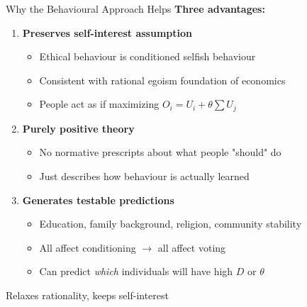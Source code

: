 \documentclass[10pt]{beamer}
\begin{document}
\begin{frame}{Why the Behavioural Approach Helps}
\textbf{Three advantages:}


\begin{enumerate}
\item \textbf{Preserves self-interest assumption}
\begin{itemize}
\item Ethical behaviour is conditioned selfish behaviour
\item Consistent with rational egoism foundation of economics
\item People act as if maximizing $O_i = U_i + \theta \sum U_j$
\end{itemize}

\item \textbf{Purely positive theory}
\begin{itemize}
\item No normative prescripts about what people "should" do
\item Just describes how behaviour is actually learned
\end{itemize}

\item \textbf{Generates testable predictions}
\begin{itemize}
\item Education, family background, religion, community stability
\item All affect conditioning $\rightarrow$ all affect voting
\item Can predict \emph{which} individuals will have high $D$ or $\theta$
\end{itemize}
\end{enumerate}


Relaxes rationality, keeps self-interest
\end{frame}
\end{document}
